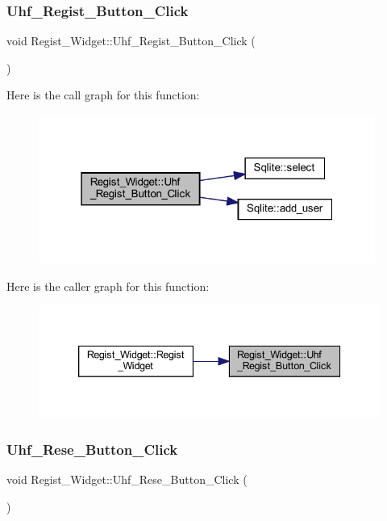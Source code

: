 \subsubsection{\texorpdfstring{Uhf\_Regist\_Button\_Click}{Uhf\_Regist\_Button\_Click}}
{\footnotesize\ttfamily void Regist\+\_\+\+Widget\+::\+Uhf\+\_\+\+Regist\+\_\+\+Button\+\_\+\+Click (\begin{DoxyParamCaption}{ }\end{DoxyParamCaption})\hspace{0.3cm}{\ttfamily [slot]}}

Here is the call graph for this function\+:
\nopagebreak
\begin{figure}[H]
\begin{center}
\leavevmode
\includegraphics[width=313pt]{class_regist___widget_ad9bd1660e89ca91615deb86a9e8a44c3_cgraph}
\end{center}
\end{figure}
Here is the caller graph for this function\+:
\nopagebreak
\begin{figure}[H]
\begin{center}
\leavevmode
\includegraphics[width=339pt]{class_regist___widget_ad9bd1660e89ca91615deb86a9e8a44c3_icgraph}
\end{center}
\end{figure}
\mbox{\label{class_regist___widget_ab97ea654f98bb920f7777ed2a7495ced}} 
\subsubsection{\texorpdfstring{Uhf\_Rese\_Button\_Click}{Uhf\_Rese\_Button\_Click}}
{\footnotesize\ttfamily void Regist\+\_\+\+Widget\+::\+Uhf\+\_\+\+Rese\+\_\+\+Button\+\_\+\+Click (\begin{DoxyParamCaption}{ }\end{DoxyParamCaption})\hspace{0.3cm}{\ttfamily [slot]}}

